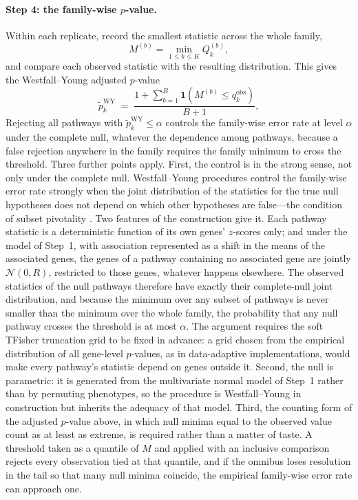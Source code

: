\paragraph{Step 4: the family-wise \texorpdfstring{$p$}{p}-value.}
Within each replicate, record the smallest statistic across the whole family,
\[
M^{(b)} = \min_{1\le k\le K} Q^{(b)}_k ,
\]
and compare each observed statistic with the resulting distribution. This gives the Westfall--Young adjusted $p$-value \citep{Westfall1993}
\[
\tilde p^{\mathrm{WY}}_k \;=\;
\frac{1+\sum_{b=1}^{B}\mathbf{1}\!\left(M^{(b)}\le q^{\mathrm{obs}}_k\right)}{B+1},
\]
Rejecting all pathways with $\tilde p^{\mathrm{WY}}_k\le\alpha$ controls the family-wise error rate at level $\alpha$ under the complete null, whatever the dependence among pathways, because a false rejection anywhere in the family requires the family minimum to cross the threshold. Three further points apply. First, the control is in the strong sense, not only under the complete null. Westfall--Young procedures control the family-wise error rate strongly when the joint distribution of the statistics for the true null hypotheses does not depend on which other hypotheses are false---the condition of subset pivotality \citep{Westfall1993}. Two features of the construction give it. Each pathway statistic is a deterministic function of its own genes' $z$-scores only; and under the model of Step~1, with association represented as a shift in the means of the associated genes, the genes of a pathway containing no associated gene are jointly $\mathcal{N}(0,R)$, restricted to those genes, whatever happens elsewhere. The observed statistics of the null pathways therefore have exactly their complete-null joint distribution, and because the minimum over any subset of pathways is never smaller than the minimum over the whole family, the probability that any null pathway crosses the threshold is at most $\alpha$. The argument requires the soft TFisher truncation grid to be fixed in advance: a grid chosen from the empirical distribution of all gene-level $p$-values, as in data-adaptive implementations, would make every pathway's statistic depend on genes outside it. Second, the null is parametric: it is generated from the multivariate normal model of Step~1 rather than by permuting phenotypes, so the procedure is Westfall--Young in construction but inherits the adequacy of that model. Third, the counting form of the adjusted $p$-value above, in which null minima equal to the observed value count as at least as extreme, is required rather than a matter of taste. A threshold taken as a quantile of $M$ and applied with an inclusive comparison rejects every observation tied at that quantile, and if the omnibus loses resolution in the tail so that many null minima coincide, the empirical family-wise error rate can approach one.


